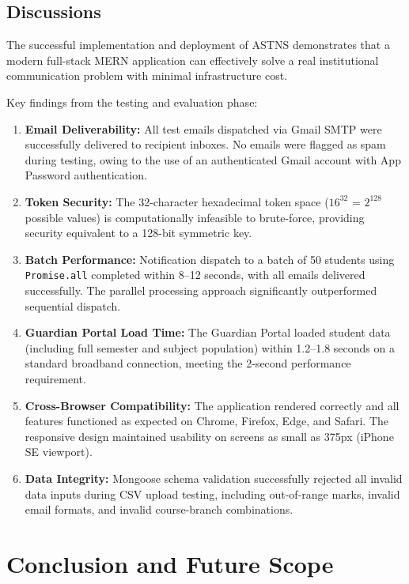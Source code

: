 \documentclass[12pt,a4paper]{report}
\begin{document}
\section{Discussions}
The successful implementation and deployment of ASTNS demonstrates that a modern full-stack MERN application can effectively solve a real institutional communication problem with minimal infrastructure cost.

Key findings from the testing and evaluation phase:

\begin{enumerate}
  \item \textbf{Email Deliverability:} All test emails dispatched via Gmail SMTP were successfully delivered to recipient inboxes. No emails were flagged as spam during testing, owing to the use of an authenticated Gmail account with App Password authentication.

  \item \textbf{Token Security:} The 32-character hexadecimal token space ($16^{32}$ = $2^{128}$ possible values) is computationally infeasible to brute-force, providing security equivalent to a 128-bit symmetric key.

  \item \textbf{Batch Performance:} Notification dispatch to a batch of 50 students using \texttt{Promise.all} completed within 8--12 seconds, with all emails delivered successfully. The parallel processing approach significantly outperformed sequential dispatch.

  \item \textbf{Guardian Portal Load Time:} The Guardian Portal loaded student data (including full semester and subject population) within 1.2--1.8 seconds on a standard broadband connection, meeting the 2-second performance requirement.

  \item \textbf{Cross-Browser Compatibility:} The application rendered correctly and all features functioned as expected on Chrome, Firefox, Edge, and Safari. The responsive design maintained usability on screens as small as 375px (iPhone SE viewport).

  \item \textbf{Data Integrity:} Mongoose schema validation successfully rejected all invalid data inputs during CSV upload testing, including out-of-range marks, invalid email formats, and invalid course-branch combinations.
\end{enumerate}

\chapter{Conclusion and Future Scope}
\end{document}
